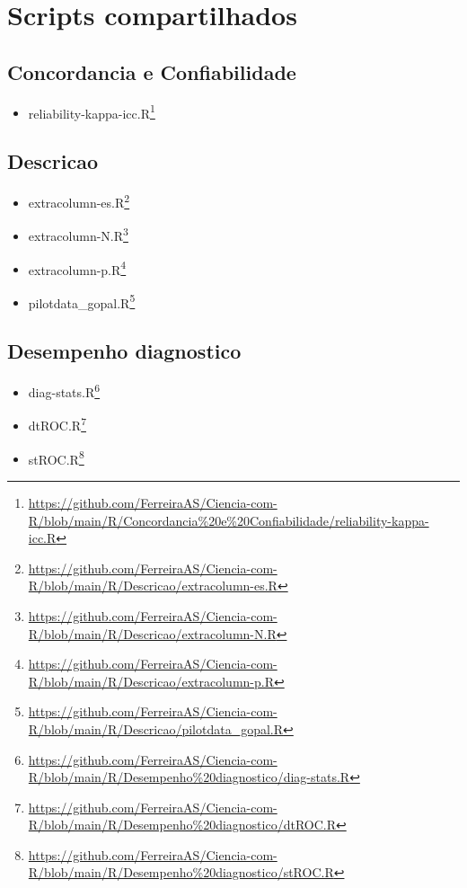 \documentclass[
  a4paper,
]{book}
\providecommand{\tightlist}{%
  \setlength{\itemsep}{0pt}\setlength{\parskip}{0pt}}
\renewcommand{\href}[2]{#2\footnote{\url{#1}}}
\begin{document}
\hypertarget{scripts-compartilhados}{%
\section{Scripts compartilhados}\label{scripts-compartilhados}}

\hypertarget{concordancia-e-confiabilidade}{%
\subsection{Concordancia e Confiabilidade}\label{concordancia-e-confiabilidade}}

\begin{itemize}
\tightlist
\item
  \href{https://github.com/FerreiraAS/Ciencia-com-R/blob/main/R/Concordancia\%20e\%20Confiabilidade/reliability-kappa-icc.R}{reliability-kappa-icc.R}
\end{itemize}

\hypertarget{descricao}{%
\subsection{Descricao}\label{descricao}}

\begin{itemize}
\item
  \href{https://github.com/FerreiraAS/Ciencia-com-R/blob/main/R/Descricao/extracolumn-es.R}{extracolumn-es.R}
\item
  \href{https://github.com/FerreiraAS/Ciencia-com-R/blob/main/R/Descricao/extracolumn-N.R}{extracolumn-N.R}
\item
  \href{https://github.com/FerreiraAS/Ciencia-com-R/blob/main/R/Descricao/extracolumn-p.R}{extracolumn-p.R}
\item
  \href{https://github.com/FerreiraAS/Ciencia-com-R/blob/main/R/Descricao/pilotdata_gopal.R}{pilotdata\_gopal.R}
\end{itemize}

\hypertarget{desempenho-diagnostico}{%
\subsection{Desempenho diagnostico}\label{desempenho-diagnostico}}

\begin{itemize}
\item
  \href{https://github.com/FerreiraAS/Ciencia-com-R/blob/main/R/Desempenho\%20diagnostico/diag-stats.R}{diag-stats.R}
\item
  \href{https://github.com/FerreiraAS/Ciencia-com-R/blob/main/R/Desempenho\%20diagnostico/dtROC.R}{dtROC.R}
\item
  \href{https://github.com/FerreiraAS/Ciencia-com-R/blob/main/R/Desempenho\%20diagnostico/stROC.R}{stROC.R}
\end{itemize}
\end{document}
